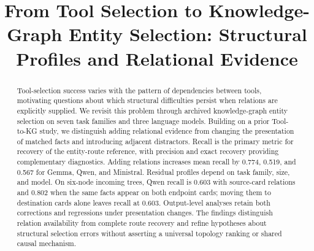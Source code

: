 \documentclass[sigconf,anonymous,review,balance=false]{acmart}
\title[Structural Selection Profiles and Relational Evidence]{From Tool Selection to Knowledge-Graph Entity Selection: Structural Profiles and Relational Evidence}
\begin{document}
\begin{abstract}
Tool-selection success varies with the pattern of dependencies between tools, motivating questions about which structural difficulties persist when relations are explicitly supplied. We revisit this problem through archived knowledge-graph entity selection on seven task families and three language models. Building on a prior Tool-to-KG study, we distinguish adding relational evidence from changing the presentation of matched facts and introducing adjacent distractors. Recall is the primary metric for recovery of the entity-route reference, with precision and exact recovery providing complementary diagnostics. Adding relations increases mean recall by 0.774, 0.519, and 0.567 for Gemma, Qwen, and Ministral. Residual profiles depend on task family, size, and model. On six-node incoming trees, Qwen recall is 0.603 with source-card relations and 0.802 when the same facts appear on both endpoint cards; moving them to destination cards alone leaves recall at 0.603. Output-level analyses retain both corrections and regressions under presentation changes. The findings distinguish relation availability from complete route recovery and refine hypotheses about structural selection errors without asserting a universal topology ranking or shared causal mechanism.
\end{abstract}
\maketitle







\clearpage


\clearpage

\end{document}
